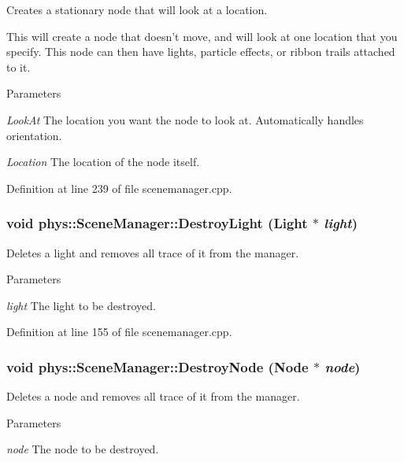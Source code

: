 Creates a stationary node that will look at a location. 

This will create a node that doesn't move, and will look at one location that you specify. This node can then have lights, particle effects, or ribbon trails attached to it. 
\begin{DoxyParams}{Parameters}
\item[{\em LookAt}]The location you want the node to look at. Automatically handles orientation. \item[{\em Location}]The location of the node itself. \end{DoxyParams}


Definition at line 239 of file scenemanager.cpp.

\hypertarget{classphys_1_1SceneManager_a0f6ebec4e8a372b0fcc2b2205bac7725}{
\subsubsection[{DestroyLight}]{\setlength{\rightskip}{0pt plus 5cm}void phys::SceneManager::DestroyLight ({\bf Light} $\ast$ {\em light})}}
\label{dd/da8/classphys_1_1SceneManager_a0f6ebec4e8a372b0fcc2b2205bac7725}


Deletes a light and removes all trace of it from the manager. 


\begin{DoxyParams}{Parameters}
\item[{\em light}]The light to be destroyed. \end{DoxyParams}


Definition at line 155 of file scenemanager.cpp.

\hypertarget{classphys_1_1SceneManager_a4c26ed31f84b171101db2b5ef184d701}{
\subsubsection[{DestroyNode}]{\setlength{\rightskip}{0pt plus 5cm}void phys::SceneManager::DestroyNode ({\bf Node} $\ast$ {\em node})}}
\label{dd/da8/classphys_1_1SceneManager_a4c26ed31f84b171101db2b5ef184d701}


Deletes a node and removes all trace of it from the manager. 


\begin{DoxyParams}{Parameters}
\item[{\em node}]The node to be destroyed. \end{DoxyParams}


